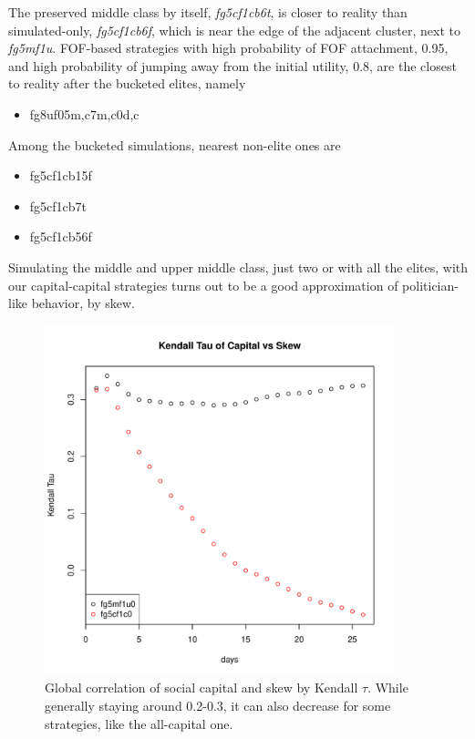 \documentclass[10pt,oneside]{memoir}
\begin{document}
\begin{Spacing}{2}
The preserved middle class by itself, {\itshape fg5cf1cb6t}, is closer to reality than simulated-only, {\itshape fg5cf1cb6f}, which is near the edge of the adjacent cluster, next to {\itshape fg5mf1u}.  FOF-based strategies with high probability of FOF attachment, 0.95,  and high probability of jumping away from the initial utility, 0.8, are the closest to reality after the bucketed elites, namely


\begin{itemize}


\item fg8uf05{m,c7m,c0d,c}
\end{itemize}

Among the bucketed simulations, nearest non-elite ones are


\begin{itemize}


\item fg5cf1cb15f

\item fg5cf1cb7t

\item fg5cf1cb56f
\end{itemize}

Simulating the middle and upper middle class, just two or with all the elites, with our capital-capital strategies turns out to be a good approximation of politician-like behavior, by skew.



\begin{figure}
\begin{center}
    \includegraphics[width=4in]{figures/kendall-tau-fg5mf1u0-fg5cf1c0}
    \caption{Global correlation of social capital and skew by Kendall $\tau$.  While generally staying around 0.2-0.3, it can also decrease for some strategies, like the all-capital one.}
    \label{figure:kendall-tau-fg5mf1u0-fg5cf1c0}
\end{center}
\end{figure}


\end{Spacing}
\end{document}
